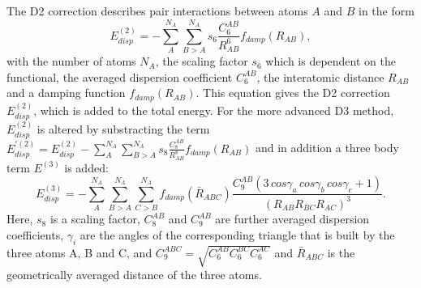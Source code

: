 \documentclass[11pt,DIV=13,BCOR=5mm,a4paper,headinclude]{scrbook}
\begin{document}
The D2 correction describes pair interactions between atoms $A$ and $B$ in the form
\begin{equation}\label{eq:d2}
 E_{disp}^{(2)} =-\sum\limits_{A}^{N_A}\sum\limits_{B>A}^{N_A} s_6 \frac{C_6^{AB}}{R_{AB}^6}f_{damp}(R_{AB}),
\end{equation}
with the number of atoms $N_A$, the scaling factor $s_6$ which is dependent on the functional, the averaged dispersion coefficient $C^{AB}_6$, the interatomic distance $R_{AB}$ and a damping function $f_{damp}(R_{AB})$.
This equation gives the D2 correction $E_{disp}^{(2)}$, which is added to the total energy.
For the more advanced D3 method, $E_{disp}^{(2)}$ is altered by substracting the term $E_{disp}^{\prime(2)}=E_{disp}^{(2)} -\sum\limits_{A}^{N_A}\sum\limits_{B>A}^{N_A} s_8 \frac{C_8^{AB}}{R_{AB}^8}f_{damp}(R_{AB})$ and in addition a three body term $E^{(3)}$ is added:
\begin{equation}
  E_{disp}^{(3)} =-\sum\limits_{A}^{N_A}\sum\limits_{B>A}^{N_A}\sum\limits_{C>B}^{N_A} f_{damp}(\bar{R}_{ABC}) \frac{C_9^{AB}(3\,cos\gamma_a\, cos\gamma_b\, cos\gamma_c+1)}{(R_{AB}R_{BC}R_{AC})^3}.
\end{equation}
Here, $s_8$ is a scaling factor, $C_8^{AB}$ and $C_9^{AB}$ are further averaged dispersion coefficients, $\gamma_i$ are the angles of the corresponding triangle that is built by the three atoms A, B and C, and $C_9^{ABC}=\sqrt{C_6^{AB}C_6^{BC}C_6^{AC}}$ and $\bar{R}_{ABC}$ is the geometrically averaged distance of the three atoms.


\end{document}
